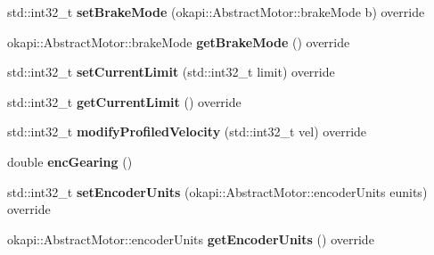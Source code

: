 \begin{DoxyCompactItemize}
std\+::int32\+\_\+t {\bfseries set\+Brake\+Mode} (okapi\+::\+Abstract\+Motor\+::brake\+Mode b) override
\item 
\mbox{\label{classExtraSpecialMotorWithExternalSensorsAsEncoders_a7dae127bac39f70638faf16aa17ebf9b}} 
okapi\+::\+Abstract\+Motor\+::brake\+Mode {\bfseries get\+Brake\+Mode} () override
\item 
\mbox{\label{classExtraSpecialMotorWithExternalSensorsAsEncoders_a90b9d8f7cb21519f93673cf415d16a8b}} 
std\+::int32\+\_\+t {\bfseries set\+Current\+Limit} (std\+::int32\+\_\+t limit) override
\item 
\mbox{\label{classExtraSpecialMotorWithExternalSensorsAsEncoders_a063f36c30acb523dd1255284ba5ec47a}} 
std\+::int32\+\_\+t {\bfseries get\+Current\+Limit} () override
\item 
\mbox{\label{classExtraSpecialMotorWithExternalSensorsAsEncoders_aa7573abc560785614b71662424ebf638}} 
std\+::int32\+\_\+t {\bfseries modify\+Profiled\+Velocity} (std\+::int32\+\_\+t vel) override
\item 
\mbox{\label{classExtraSpecialMotorWithExternalSensorsAsEncoders_a165795fb85bd0542793469d6f6ed0a0b}} 
double {\bfseries enc\+Gearing} ()
\item 
\mbox{\label{classExtraSpecialMotorWithExternalSensorsAsEncoders_a08ec684e25bc9a79fcebff57f3792f0f}} 
std\+::int32\+\_\+t {\bfseries set\+Encoder\+Units} (okapi\+::\+Abstract\+Motor\+::encoder\+Units eunits) override
\item 
\mbox{\label{classExtraSpecialMotorWithExternalSensorsAsEncoders_ac223ecd0ded6cdab47027da22ba9820e}} 
okapi\+::\+Abstract\+Motor\+::encoder\+Units {\bfseries get\+Encoder\+Units} () override
\item 
\mbox{\label{classExtraSpecialMotorWithExternalSensorsAsEncoders_a9bb9076765a1d8a346b4e4d9bec0f06d}} 

\end{DoxyCompactItemize}

